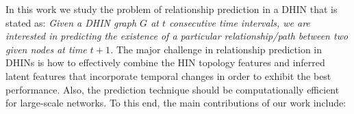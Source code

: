 In this work we study the problem of relationship prediction in a DHIN that is stated as: \textit{Given a DHIN graph $G$ at $t$ consecutive time intervals, we are interested in predicting the existence of a particular relationship/path between two given nodes at time $t+1$.} The major challenge in relationship prediction in DHINs is how to effectively combine the HIN topology features and inferred latent features that incorporate temporal changes in order to exhibit the best performance. Also, the prediction technique should be computationally efficient for large-scale networks. To this end, the main contributions of our work include:












